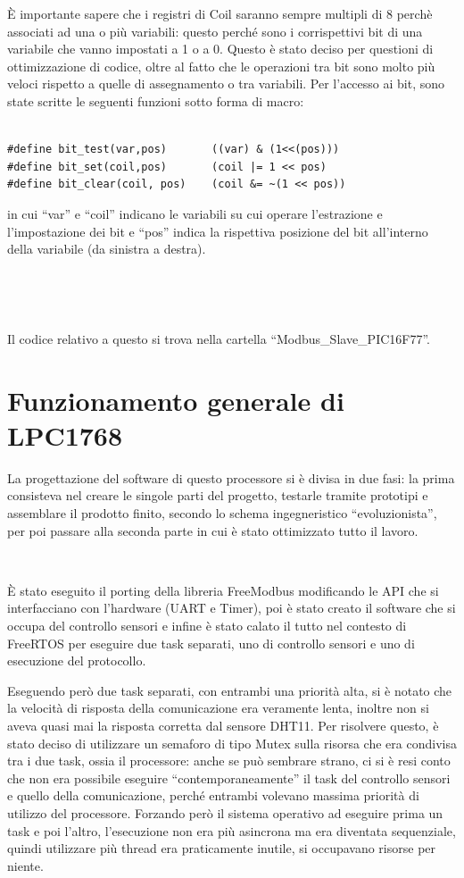 \documentclass[a4paper,titlepage]{book}
\begin{document}
È importante sapere che i registri di Coil saranno sempre multipli di 8 perchè associati ad una o più variabili: questo perché sono i corrispettivi bit di una variabile che vanno impostati a 1 o a 0. Questo è stato deciso per questioni di ottimizzazione di codice, oltre al fatto che le operazioni tra bit sono molto più veloci rispetto a quelle di assegnamento o tra variabili. Per l'accesso ai bit, sono state scritte le seguenti funzioni sotto forma di macro:

\begin{lstlisting}

#define bit_test(var,pos)       ((var) & (1<<(pos)))
#define bit_set(coil,pos)       (coil |= 1 << pos)
#define bit_clear(coil, pos)    (coil &= ~(1 << pos))

\end{lstlisting} 

in cui ``var'' e ``coil'' indicano le variabili su cui operare l'estrazione e l'impostazione dei bit e ``pos'' indica la rispettiva posizione del bit all'interno della variabile (da sinistra a destra).

~

~

Il codice relativo a questo si trova nella cartella ``Modbus\_Slave\_PIC16F77''.

\section{Funzionamento generale di LPC1768}

La progettazione del software di questo processore si è divisa in due fasi: la prima consisteva nel creare le singole parti del progetto, testarle tramite prototipi e assemblare il prodotto finito, secondo lo schema ingegneristico ``evoluzionista'', per poi passare alla seconda parte in cui è stato ottimizzato tutto il lavoro.

~

È stato eseguito il porting della libreria FreeModbus modificando le API che si interfacciano con l'hardware (UART e Timer), poi è stato creato il software che si occupa del controllo sensori e infine è stato calato il tutto nel contesto di FreeRTOS per eseguire due task separati, uno di controllo sensori e uno di esecuzione del protocollo.

Eseguendo però due task separati, con entrambi una priorità alta, si è notato che la velocità di risposta della comunicazione era veramente lenta, inoltre non si aveva quasi mai la risposta corretta dal sensore DHT11. Per risolvere questo, è stato deciso di utilizzare un semaforo di tipo Mutex sulla risorsa che era condivisa tra i due task, ossia il processore: anche se può sembrare strano, ci si è resi conto che non era possibile eseguire ``contemporaneamente'' il task del controllo sensori e quello della comunicazione, perché entrambi volevano massima priorità di utilizzo del processore. Forzando però il sistema operativo ad eseguire prima un task e poi l'altro, l'esecuzione non era più asincrona ma era diventata sequenziale, quindi utilizzare più thread era praticamente inutile, si occupavano risorse per niente.
\end{document}
